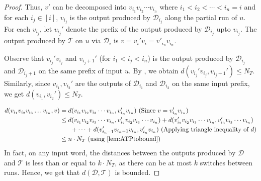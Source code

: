 \documentclass[a4paper,UKenglish,cleveref, autoref, thm-restate,authorcolumns, colorlinks]{lipics-v2021}
\newcommand\calD{\mathcal{D}}
\newcommand\calT{\mathcal{T}}
\begin{document}
{\begin{proof}
    Thus, $v'$ can be decomposed into $v_{i_1}v_{i_2} \cdots v_{i_n}$ where $i_1 < i_2 < \cdots < i_n = i$ and for each $i_j \in [i]$, $v_{i_j}$ is the output produced by $\calD_{i_j}$ along the partial run of $u$. For each $v_{i_j}$, let $v_{i_j}'$ denote the prefix of the output produced by $\calD_{i_j}$ upto $v_{i_j}$. The output produced by $\calT$ on $u$ via $\calD_i$ is $v = v_i'v_i = v'_{i_n}v_{i_n}$.

    \begin{center}
\end{center}
    
 Observe that $v_{i_j}'v_{i_j}$ and $v_{{i_j}+1}'$ (for $i_1 < i_j < i_n$) is the output produced by $\calD_{i_j}$ and $\calD_{{i_j}+1}$ on the same prefix of input $u$. By , we obtain $d(v_{i_j}'v_{i_j},v_{{i_j}+1}') \leq N_T$. Similarly,  since $v_{i_1},v_{i_2}'$ are the outputs of $\calD_{i_1}$ and $\calD_{i_2}$ on the same input prefix, we get $d(v_{i_1},v_{i_2}') \leq N_T$.
    
    \begin{align*}
     d(v_{i_1}v_{i_2}v_{i_3} \ldots v_{i_n},v) &= d(v_{i_1}v_{i_2}v_{i_3} \cdots v_{i_n},v_{i_n}'v_{i_n}) \text{ (Since $v= v_{i_n}'v_{i_n}$)}\\
     &\leq d(v_{i_1}v_{i_2}v_{i_3} \cdots v_{i_n},v_{i_2}'v_{i_2}v_{i_3} \cdots v_{i_n}) + d(v_{i_2}'v_{i_2}v_{i_3} \cdots v_{i_n},v_{i_3}'v_{i_3} \cdots v_{i_n})\\
     & \hspace{0.6cm} + \cdots + d(v_{{i_n}-1}'v_{{i_n}-1}v_{i_n},v_{i_n}'v_{i_n}) \text{ (Applying triangle inequality of $d$)}\\
     &\leq n \cdot N_T  \text{ (using \Cref{lem:ATPtobound})}   
    \end{align*}
    In fact, on any input word, the distances between the outputs produced by $\calD$ and $\calT$ is less than or equal to $k \cdot N_T$, 
    as there can be at most $k$ switches between runs.
    Hence, we get that $d(\calD,\calT)$ is bounded.
\end{proof}

}
\end{document}

